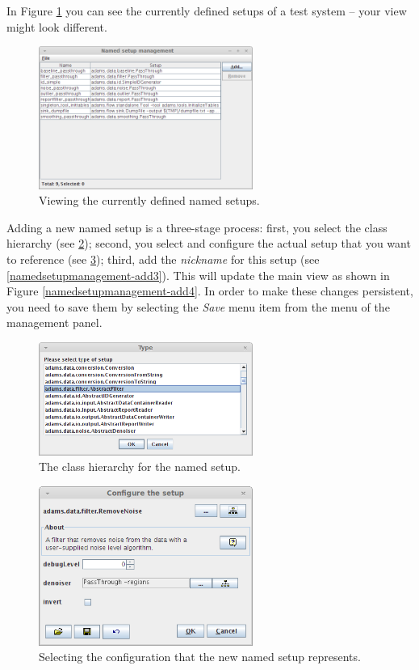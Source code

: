 In Figure \ref{namedsetupmanagement-main} you can see the currently defined
setups of a test system -- your view might look different.

\begin{figure}[htb]
  \centering
  \includegraphics[width=7.0cm]{images/namedsetupmanagement-main.png}
  \caption{Viewing the currently defined named setups.}
  \label{namedsetupmanagement-main}
\end{figure}

Adding a new named setup is a three-stage process: first, you select the
class hierarchy (see \ref{namedsetupmanagement-add1}); second, you select and
configure the actual setup that you want to reference (see 
\ref{namedsetupmanagement-add2}); third, add the \textit{nickname} for 
this setup (see \ref{namedsetupmanagement-add3}). This will update the main
view as shown in Figure \ref{namedsetupmanagement-add4}. In order to make these
changes persistent, you need to save them by selecting the \textit{Save} menu 
item from the menu of the management panel.

\begin{figure}[htb]
  \centering
  \includegraphics[width=7.0cm]{images/namedsetupmanagement-add1.png}
  \caption{The class hierarchy for the named setup.}
  \label{namedsetupmanagement-add1}
\end{figure}

\begin{figure}[htb]
  \centering
  \includegraphics[width=7.0cm]{images/namedsetupmanagement-add2.png}
  \caption{Selecting the configuration that the new named setup represents.}
  \label{namedsetupmanagement-add2}
\end{figure}

